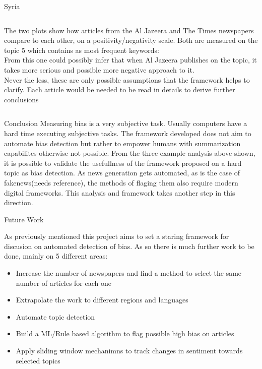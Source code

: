 \documentclass[final]{beamer}
\newlength{\twocolwid}
\begin{document}
\begin{frame}[t]
\begin{columns}[t]
\begin{column}{\twocolwid}
\begin{block}{Syria}
\begin{columns}
        \begin{column}{.55\textwidth}
            The two plots show how articles from the Al Jazeera and The Times newspapers compare to each other, on a positivity/negativity scale.
            Both are measured on the topic 5 which contains as most frequent keywords:  \\
            From this one could possibly infer that when Al Jazeera publishes on the topic, it takes more serious and possible more negative approach to it.\\
            Never the less, these are only possible assumptions that the framework helps to clarify. Each article would be needed to be read in details to derive further conclusions
        \end{column}
    \end{columns}
\end{block}


\begin{block}{Conclusion {}}
    Measuring bias is a very subjective task. 
    Usually computers have a hard time executing subjective tasks. 
    The framework developed does not aim to automate bias detection but 
    rather to empower humans with summarization capabilites otherwise not possible.
    From the three example analysis above shown, it is possible to validate the usefullness of the framework proposed on a hard topic as bias detection.
    As news generation gets automated, as is the case of fakenews(needs reference), the methods of flaging them also require modern digital frameworks.
    This analysis and framework takes another step in this direction.

\end{block}


\begin{block}{Future Work {}}

    As previously mentioned this project aims to set a staring framework for discusion on automated detection of bias. 
    As so there is much further work to be done, mainly on 5 different areas:

    \begin{itemize}
        \item Increase the number of newspapers and find a method to select the same number of articles for each one
        \item Extrapolate the work to different regions and languages
        \item Automate topic detection 
        \item Build a ML/Rule based algorithm to flag possible high bias on articles
        \item Apply sliding window mechanimns to track changes in sentiment towards selected topics
    \end{itemize}


\end{block}
\end{column}
\end{columns}
\end{frame}
\end{document}
